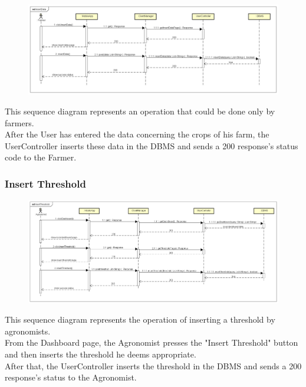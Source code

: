 \begin{figure}[H]
    \begin{center}
        \includegraphics[width=\textwidth]{Images/SequenceDiagrams/InsertDataDD.png}
    \end{center}
\end{figure}

This sequence diagram represents an operation that could be done only by farmers.\\
After the User has entered the data concerning the crops of his farm, the UserController 
inserts these data in the DBMS and sends a 200 response's status code to the Farmer.


\newpage
\subsubsection{Insert Threshold}

\begin{figure}[H]
    \begin{center}
        \includegraphics[width=\textwidth]{Images/SequenceDiagrams/InsertThresholdDD.png}
    \end{center}
\end{figure}

This sequence diagram represents the operation of inserting a threshold by agronomists.\\
From the Dashboard page, the Agronomist presses the "Insert Threshold" button and then inserts the threshold he deems appropriate.\\
After that, the UserController inserts the threshold in the DBMS and sends a 200 response's status to the Agronomist.


